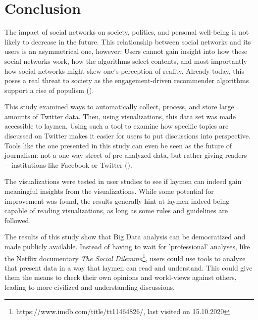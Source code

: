 \section{Conclusion}
The impact of social networks on society, politics, and personal well-being is not likely to decrease in the future. This relationship between social networks and its users is an asymmetrical one, however: Users cannot gain insight into how these social networks work, how the algorithms select contents, and most importantly how social networks might skew one's perception of reality. Already today, this poses a real threat to society as the engagement-driven recommender algorithms support a rise of populism (\cite{groshekHelpingPopulismWin2017}).

This study examined ways to automatically collect, process, and store large amounts of Twitter data. Then, using visualizations, this data set was made accessible to laymen. Using such a tool to examine how specific topics are discussed on Twitter makes it easier for users to put discussions into perspective. Tools like the one presented in this study can even be seen as the future of journalism: not a one-way street of pre-analyzed data, but rather giving readers ---institutions like Facebook or Twitter (\cite{angwinMakingPrivacyPersonal2020}).

The visualizations were tested in user studies to see if laymen can indeed gain meaningful insights from the visualizations. While some potential for improvement was found, the results generally hint at laymen indeed being capable of reading visualizations, as long as some rules and guidelines are followed.

The results of this study  show that Big Data analysis can be democratized and made publicly available. Instead of having to wait for 'professional' analyses, like the Netflix documentary \emph{The Social Dilemma}\footnote{https://www.imdb.com/title/tt11464826/, last visited on 15.10.2020}, users could use tools to analyze that present data in a way that laymen can read and understand. This could give them the means to check their own opinions and world-views against others, leading to more civilized and understanding discussions.




